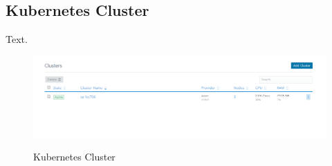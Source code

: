 \subsection{Kubernetes Cluster}

Text. 

\begin{figure}[H]
\centering
\caption {Kubernetes Cluster}
\includegraphics[width=\linewidth]{images/cluster-overview.png}
\label{fig:clusterOverview}
\end{figure}

